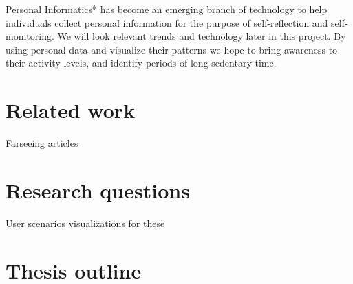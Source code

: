 Personal Informatics* has become an emerging branch of technology to help individuals collect personal information for the purpose of self-reflection and self-monitoring. We will look relevant trends and technology later in this project. By using personal data and visualize their patterns we hope to bring awareness to their activity levels, and identify periods of long sedentary time. 

\section{Related work}
Farseeing articles
\section{Research questions}
User scenarios visualizations for these
\section{Thesis outline}
